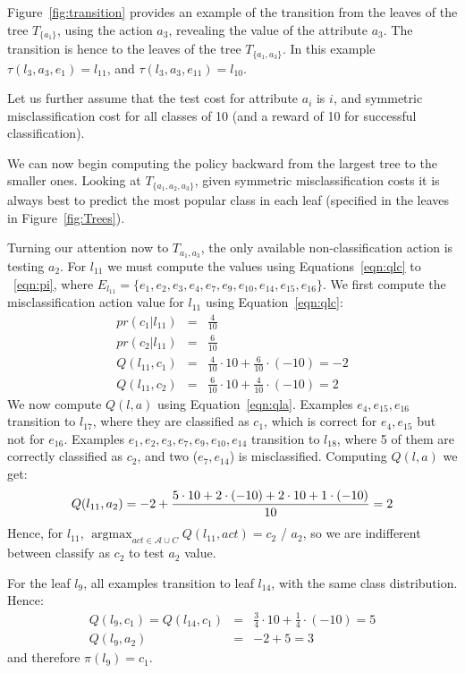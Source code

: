 \documentclass[letterpaper]{article}
\DeclareMathOperator*{\argmax}{argmax}
\theoremstyle{definition}
\begin{document}
Figure~\ref{fig:transition} provides an example of the transition from the leaves of the tree $T_{\{a_1\}}$, using the action $a_3$, revealing the value of the attribute $a_3$. The transition is hence to the leaves of the tree $T_{\{a_1,a_3\}}$. In this example $\tau(l_3,a_3,e_1)=l_{11}$, and $\tau(l_3,a_3,e_{11})=l_{10}$.



Let us further assume that the test cost for attribute $a_i$ is $i$, and symmetric misclassification cost for all classes of 10 (and a reward of 10 for successful classification). 

We can now begin computing the policy backward from the largest tree to the smaller ones. Looking at $T_{\{a_1,a_2,a_3\}}$, given symmetric misclassification costs it is always best to predict the most popular class in each leaf (specified in the leaves in Figure~\ref{fig:Trees}). 

Turning our attention now to $T_{a_1,a_3}$, the only available non-classification action is testing $a_2$. For $l_{11}$ we must compute the values using Equations~\ref{eqn:qlc} to ~\ref{eqn:pi}, where $E_{l_{11}} = \{e_1,e_2,e_3,e_4,e_7,e_9,e_{10},e_{14},e_{15},e_{16} \}$. We first compute the misclassification action value for $l_{11}$ using Equation~\ref{eqn:qlc}:
{\small
\begin{eqnarray}
pr(c_1|l_{11}) &=& \frac{4}{10} \\
pr(c_2|l_{11}) &=& \frac{6}{10} \\
Q(l_{11},c_1) &=& \frac{4}{10} \cdot 10 + \frac{6}{10} \cdot (-10) = -2\\
Q(l_{11},c_2) &=& \frac{6}{10} \cdot 10 + \frac{4}{10} \cdot (-10) = 2
\end{eqnarray}
}%
We now compute $Q(l,a)$ using Equation~\ref{eqn:qla}. Examples $e_4,e_{15},e_{16}$ transition to $l_{17}$, where they are classified as $c_1$, which is correct for $e_4,e_{15}$ but not for $e_{16}$. Examples $e_1,e_2,e_3,e_7,e_9,e_{10},e_{14}$ transition to $l_{18}$, where 5 of them are correctly classified as $c_2$, and two ($e_{7},e_{14}$) is misclassified. Computing $Q(l,a)$ we get:
\begin{equation}
\small
Q(l_{11},a_2) = -2 + \frac{5 \cdot 10 + 2 \cdot (-10) + 2 \cdot 10 + 1 \cdot (-10)}{10} = 2
\end{equation}
Hence, for $l_{11}$, $\argmax_{act \in \mathcal{A} \cup C} Q(l_{11},act) = c_2$ / $a_2$, so we are indifferent between classify as $c_2$ to test $a_2$ value. 

For the leaf $l_9$, all examples transition to leaf $l_{14}$, with the same class distribution. Hence:
{\small
\begin{align}
Q(l_{9},c_1) = Q(l_{14},c_1) &=& \frac{3}{4} \cdot 10 + \frac{1}{4} \cdot (-10) = 5\\
Q(l_9,a_2) &=& -2 + 5 = 3
\end{align}
}%
and therefore $\pi(l_9)=c_1$.
\end{document}
